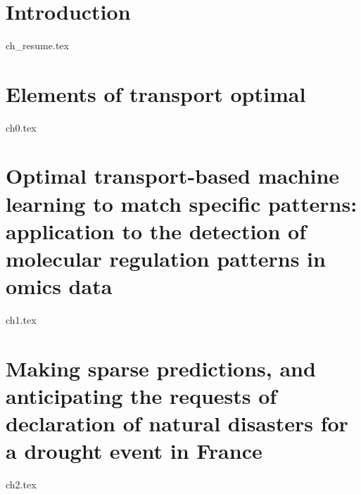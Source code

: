 \documentclass{Classe/Dissertate}
\begin{document}
 \setcounter{page}{1}
 

%


    \lab
    
    
        

~\newpage
\vspace{0.1cm}


~\newpage


~\newpage



    \tableofcontents
     
    \clearpage
    
    \OddChapter%
    
	\setcounter{page}{1}
    \restoregeometry
    
\renewcommand{\contentsname}{}
\setcounter{tocdepth}{3}
\addtocounter{chapter}{0}


\ChangeColor%
\chapter{Introduction}
\LocalTOC%
{ch_resume.tex}
\OddChapter%
\clearpage


\ChangeColor%
\chapter{Elements of transport optimal}
\LocalTOC%
{ch0.tex}
\OddChapter%
\clearpage



\ChangeColor%
\chapter{Optimal transport-based machine learning to match specific patterns: application to the detection of molecular regulation patterns in omics data}
\ChapFrame%
\LocalTOC%
{ch1.tex}
\OddChapter%
\clearpage
%

\ChangeColor%
\chapter{Making sparse predictions, and anticipating the requests of declaration
  of natural  disasters for a drought  event in France}
\ChapFrame%
\LocalTOC%
{ch2.tex}
\OddChapter%
\clearpage
\end{document}
